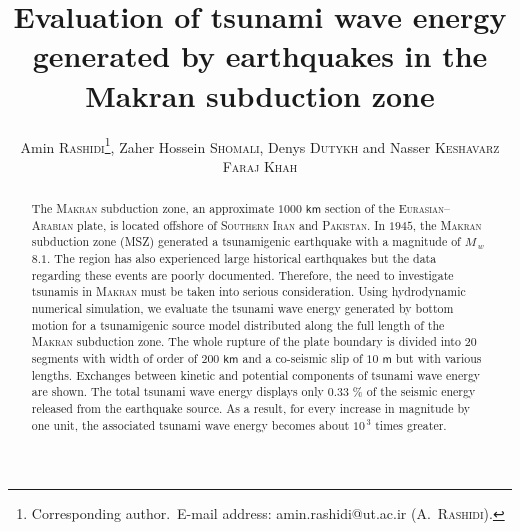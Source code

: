 \documentclass[12pt]{llncs}
\begin{document}

\title{Evaluation of tsunami wave energy generated by earthquakes in the Makran subduction zone}

\author{Amin \textsc{Rashidi}\thanks{Corresponding author.\  E-mail address: amin.rashidi@ut.ac.ir (A.~\textsc{Rashidi}).}, Zaher Hossein \textsc{Shomali}, Denys \textsc{Dutykh} and Nasser \textsc{Keshavarz Faraj Khah}}
%
%

\maketitle              


\begin{abstract}
The \textsc{Makran} subduction zone, an approximate $1000$ $\mathsf{km}$ section of the \textsc{Eurasian}--\textsc{Arabian} plate, is located offshore of \textsc{Southern Iran} and \textsc{Pakistan}. In $1945$, the \textsc{Makran} subduction zone (MSZ) generated a tsunamigenic earthquake with a magnitude of $M_{\,w}$ $8.1$. The region has also experienced large historical earthquakes but the data regarding these events are poorly documented. Therefore, the need to investigate tsunamis in \textsc{Makran} must be taken into serious consideration. Using hydrodynamic numerical simulation, we evaluate the tsunami wave energy generated by bottom motion for a tsunamigenic source model distributed along the full length of the \textsc{Makran} subduction zone. The whole rupture of the plate boundary is divided into $20$ segments with width of order of $200$ $\mathsf{km}$ and a co-seismic slip of $10$ $\mathsf{m}$ but with various lengths. Exchanges between kinetic and potential components of tsunami wave energy are shown. The total tsunami wave energy displays only $0.33$ $\%$ of the seismic energy released from the earthquake source. As a result, for every increase in magnitude by one unit, the associated tsunami wave energy becomes about $10^{\,3}$ times greater.

\end{abstract}
\end{document}
